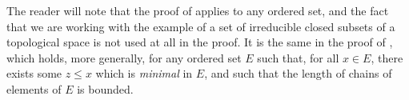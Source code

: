 \begin{rmk}[14.3.6]
\label{0.14.3.6}
The reader will note that the proof of  applies to any ordered set, and the fact that we are working with the example of a set of irreducible closed subsets of a topological space is not used at all in the proof.
It is the same in the proof of , which holds, more generally, for any ordered set $E$ such that, for all $x\in E$, there exists some $z\leq x$ which is \emph{minimal} in $E$, and such that the length of chains of elements of $E$ is bounded.
\end{rmk}
